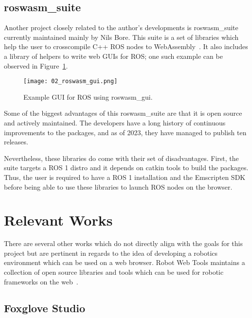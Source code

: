     \subsection{roswasm\_suite}

        Another project closely related to the author's developments is \textsf{roswasm\_suite} currently maintained mainly by Nils Bore. This suite is a set of libraries which help the user to cross\-compile C++ ROS nodes to WebAssembly~\cite{roswasmsuite}. It also includes a library of helpers to write web \ac{GUI}s for ROS; one such example can be observed in Figure~\ref{fig:roswasm_gui}.

        \begin{figure}[htbp]
            \centering
            \texttt{[image: 02\_roswasm\_gui.png]}
            \caption{Example \ac{GUI} for ROS using \textsf{roswasm\_gui}.}
            \label{fig:roswasm_gui}
        \end{figure}

        Some of the biggest advantages of this \textsf{roswasm\_suite} are that it is open source and actively maintained. The developers have a long history of continuous improvements to the packages, and as of 2023, they have managed to publish ten releases. 

        Nevertheless, these libraries do come with their set of disadvantages. First, the suite targets a \ac{ROS} 1 distro and it depends on \textsf{catkin} tools to build the packages. Thus, the user is required to have a \ac{ROS} 1 installation and the Emscripten \ac{SDK} before being able to use these libraries to launch \ac{ROS} nodes on the browser.


\section{Relevant Works}

    There are several other works which do not directly align with the goals for this project but are pertinent in regards to the idea of developing a robotics environment which can be used on a web browser. Robot Web Tools maintains a collection of open source libraries and tools which can be used for robotic frameworks on the web~\cite{robotwebtools}.
    
    \subsection{Foxglove Studio}

